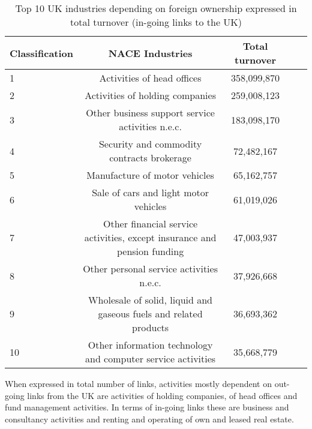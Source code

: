 \begin{table}[!ht]
\begin{adjustwidth}{-2.25in}{0in}
\caption{Top 10 UK industries depending on foreign ownership expressed in total turnover (in-going links to the UK)\label{tab:uk_ingoing}}
\centering
\medskip
\begin{tabular}{|l|c|c|c|c|}
\hline
Classification  & NACE Industries & Total turnover \\ 
\hline
1 &      Activities of head offices &  358,099,870  \\
\hline
2 & Activities of holding companies  & 259,008,123  \\
\hline
3 & Other business support service activities n.e.c. & 183,098,170 \\
\hline
4 &  Security and commodity contracts brokerage  &  72,482,167 \\
\hline
5 &  Manufacture of motor vehicles  &   65,162,757 \\
\hline
6 &  Sale of cars and light motor vehicles  &    61,019,026  \\
\hline
7 &  Other financial service activities, except insurance and pension funding & 47,003,937 \\
\hline
8 &  Other personal service activities n.e.c.  & 37,926,668  \\
\hline
9 &  Wholesale of solid, liquid and gaseous fuels and related products & 36,693,362 \\
\hline
10 &  Other information technology and computer service activities  &  35,668,779 \\
\hline
\end{tabular}
\end{adjustwidth}
\end{table}

\newpage
When expressed in total number of links, activities mostly dependent on out-going links from the UK are activities of holding companies, of head offices and fund management activities. In terms of in-going links these are business and consultancy activities and renting and operating of own and leased real estate.

